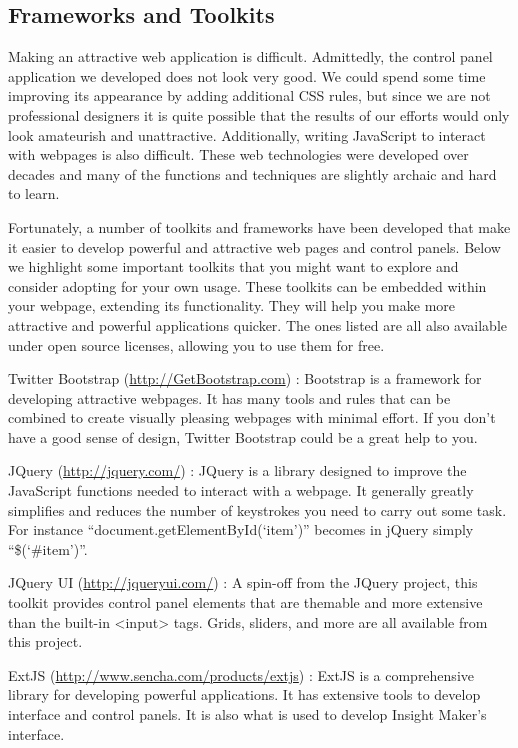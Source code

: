 \documentclass[]{memoir}
\begin{document}
\subsection{Frameworks and Toolkits}

Making an attractive web application is difficult. Admittedly, the
control panel application we developed does not look very good. We could
spend some time improving its appearance by adding additional CSS rules,
but since we are not professional designers it is quite possible that
the results of our efforts would only look amateurish and unattractive.
Additionally, writing JavaScript to interact with webpages is also
difficult. These web technologies were developed over decades and many
of the functions and techniques are slightly archaic and hard to learn.

Fortunately, a number of toolkits and frameworks have been developed
that make it easier to develop powerful and attractive web pages and
control panels. Below we highlight some important toolkits that you
might want to explore and consider adopting for your own usage. These
toolkits can be embedded within your webpage, extending its
functionality. They will help you make more attractive and powerful
applications quicker. The ones listed are all also available under open
source licenses, allowing you to use them for free.

Twitter Bootstrap (\url{http://GetBootstrap.com}) : Bootstrap is a
framework for developing attractive webpages. It has many tools and
rules that can be combined to create visually pleasing webpages with
minimal effort. If you don't have a good sense of design, Twitter
Bootstrap could be a great help to you.

JQuery (\url{http://jquery.com/}) : JQuery is a library designed to
improve the JavaScript functions needed to interact with a webpage. It
generally greatly simplifies and reduces the number of keystrokes you
need to carry out some task. For instance
``document.getElementById(`item')'' becomes in jQuery simply
``\$(`\#item')''.

JQuery UI (\url{http://jqueryui.com/}) : A spin-off from the JQuery
project, this toolkit provides control panel elements that are themable
and more extensive than the built-in \textless{}input\textgreater{}
tags. Grids, sliders, and more are all available from this project.

ExtJS (\url{http://www.sencha.com/products/extjs}) : ExtJS is a
comprehensive library for developing powerful applications. It has
extensive tools to develop interface and control panels. It is also what
is used to develop Insight Maker's interface.
\end{document}
